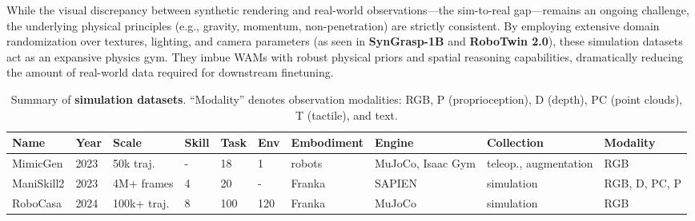 \vspace{1mm}
While the visual discrepancy between synthetic rendering and real-world observations—the sim-to-real gap—remains an ongoing challenge, the underlying physical principles (e.g., gravity, momentum, non-penetration) are strictly consistent. By employing extensive domain randomization over textures, lighting, and camera parameters (as seen in \textbf{SynGrasp-1B} and \textbf{RoboTwin 2.0}), these simulation datasets act as an expansive physics gym. They imbue WAMs with robust physical priors and spatial reasoning capabilities, dramatically reducing the amount of real-world data required for downstream finetuning.



\begin{table}[t]
    \centering
    \scriptsize
    \setlength{\tabcolsep}{3.5pt}
    \renewcommand{\arraystretch}{1.08}
    \caption{Summary of \textbf{simulation datasets}. ``Modality'' denotes observation modalities: RGB, P (proprioception), D (depth), PC (point clouds), T (tactile), and text.}
    \label{tab:sim_data}
    \vspace{-6pt}
    
    \begin{adjustbox}{width=\columnwidth}
    \begin{threeparttable}
    \begin{tabular}{
    >{\RaggedRight\arraybackslash}p{2.25cm}
    l l l l l
    >{\RaggedRight\arraybackslash}p{2.20cm}
    >{\RaggedRight\arraybackslash}p{2.05cm}
    >{\RaggedRight\arraybackslash}p{1.75cm}
    >{\RaggedRight\arraybackslash}p{1.80cm}
    }
    \toprule
    \textbf{Name} & \textbf{Year} & \textbf{Scale} & \textbf{Skill} & \textbf{Task} & \textbf{Env} & \textbf{Embodiment} & \textbf{Engine} & \textbf{Collection} & \textbf{Modality} \\
    \midrule
    
    MimicGen \cite{MimicGen} & 2023 & 50k traj. 
    & - & 18 & 1 & 4 robots & MuJoCo, Isaac Gym & teleop., augmentation & RGB \\

    ManiSkill2 \cite{ManiSkill2} & 2023 & 4M+ frames 
    & 4 & 20 & - & Franka & SAPIEN & simulation & RGB, D, PC, P \\

    RoboCasa \cite{RoboCasa} & 2024 & 100k+ traj. 
    & 8 & 100 & 120 & Franka & MuJoCo & simulation & RGB \\


\end{tabular}
\end{threeparttable}
\end{adjustbox}
\end{table}
